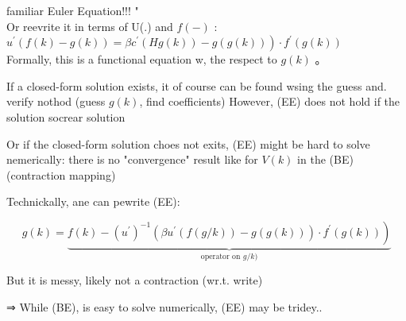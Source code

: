 \documentclass[10pt]{article}
\begin{document}
familiar Euler Equation!!! "\\
Or reevrite it in terms of U(.) and $f(-)$ :\\
$\left.u^{\prime}(f(k)-g(k))=\beta c^{\prime}(H g(k))-g(g(k))\right) \cdot f^{\prime}(g(k))$\\
Formally, this is a functional equation w, the respect to $g(k)$ 。

If a closed-form solution exists, it of course can be found wsing the guess and.\\
verify nothod (guess $g(k)$, find coefficients) However, (EE) does not hold if the solution socrear solution

Or if the closed-form solution choes not exits, (EE) might be hard to solve nemerically: there is no "convergence" result like for $V(k)$ in the (BE) (contraction mapping)

Technickally, ane can pewrite (EE):

$$
g(k)=\underbrace{\left.f(k)-\left(u^{\prime}\right)^{-1}\left(\beta u^{\prime}(f(g / k))-g(g(k))\right) \cdot f^{\prime}(g(k))\right)}_{\text {operator on } g / k)}
$$

But it is messy, likely not a contraction (wr.t. write)

⇒ While (BE), is easy to solve numerically, (EE) may be tridey..
\end{document}
